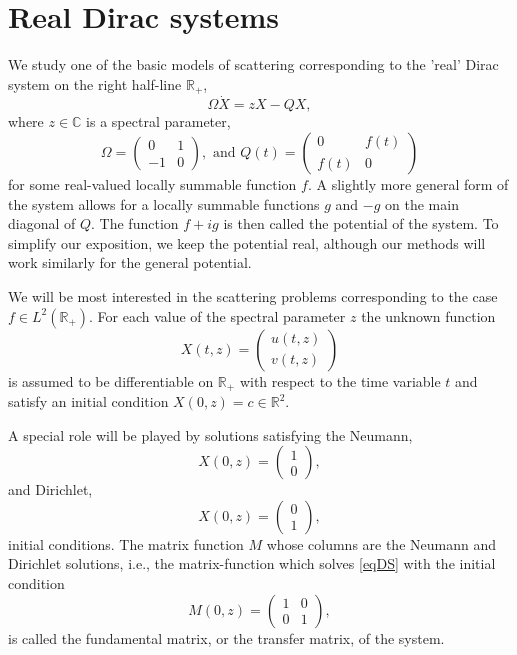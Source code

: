\documentclass[11pt,twoside,reqno]{amsart}
\def\R{{\mathbb R}}
\def\C{{\mathbb{C}}}
\theoremstyle{plain}
\numberwithin{equation}{section}
\begin{document}
\section{Real Dirac systems}\label{secDS}

We study one of the basic models of scattering corresponding to the 'real' Dirac system on the right half-line $\R_+$,
\begin{equation} \Omega \dot X =z X - QX,
\label{eqDS}\end{equation}
where $z\in\C$ is a spectral parameter,
$$ \Omega=\begin{pmatrix} 0 & 1 \\ -1 & 0 \end{pmatrix},\textrm{ and  }Q(t)=\begin{pmatrix} 0 & f(t) \\ f(t) & 0 \end{pmatrix} $$
for some real-valued locally summable function $f$. A slightly more general form of the system allows
for a locally summable functions $g$ and $-g$ on the main diagonal of $Q$. The function $f+ig$
is then called the potential of the system.
To simplify our exposition, we keep the potential real, although our methods will work similarly
for the general potential.


We will be most interested in  the scattering
problems corresponding to the case $f\in L^2(\R_+)$. For each value of the spectral parameter $z$ the unknown function $$X(t,z)=\begin{pmatrix} u(t,z) \\ v(t,z) \end{pmatrix}$$
is assumed to be differentiable on $\R_+$  with respect to the time variable $t$ and satisfy an initial condition  $X(0,z)=c\in \R^2$.

A special role will be played by solutions  satisfying the Neumann, $$X(0,z)=\begin{pmatrix} 1 \\ 0 \end{pmatrix},$$
and Dirichlet, $$X(0,z)=\begin{pmatrix} 0 \\ 1 \end{pmatrix},$$ initial conditions.
The matrix function $M$ whose columns are the Neumann and Dirichlet solutions, i.e., the matrix-function which solves
\eqref{eqDS} with the initial condition $$M(0,z)=\begin{pmatrix} 1 & 0 \\ 0 & 1 \end{pmatrix},$$ is called
the fundamental matrix, or the transfer matrix,  of the system.
\end{document}

